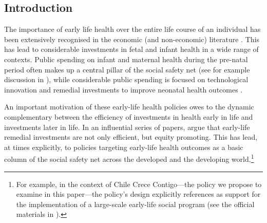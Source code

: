 \documentclass[12pt]{article}
\begin{document}
\begin{spacing}{1.4}
\clearpage
\section{Introduction}
The importance of early life health over the entire life course of an
individual has been extensively recognised in the economic (and
non-economic) literature \citep{Almondetal2017,AlmondCurrie2011,Barker1990}.
This has lead to considerable investments in fetal and infant health in
a wide range of contexts.  Public spending on infant and maternal health
during the pre-natal period often makes up a central pillar of the social
safety net (see for example discussion in \citep{BitlerKaroly2015}), while
considerable public spending is focused on technological innovation and
remedial investments to improve neonatal health outcomes
\citep{Almondetal2010,Bharadwajetal2013}.

An important motivation of these early-life health policies owes
to the dynamic complementary between the efficiency of investments in health
early in life and investments later in life.  In an influential series of
papers, \citet{HeckmanCunha2007,CunhaHeckman2009,Cunhaetal2010} argue that
early-life remedial investments are not only efficient, but equity promoting.
This has lead, at times explicitly, to policies targeting early-life health
outcomes as a basic column of the social safety net across the developed and
the developing world.\footnote{For example,
  in the context of Chile Crece Contigo---the policy we propose to examine in
  this paper---the policy's design explicitly references
  \citet{HeckmanCarneiro2003} as support for the implementation of a
  large-scale early-life social program (see the official materials in
  \citet{Arrietetal2013}).}


\end{spacing}
\end{document}
